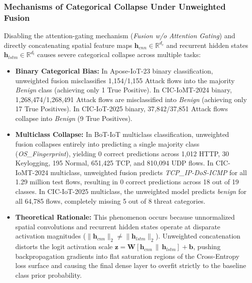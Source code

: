 \documentclass[a4paper,fleqn]{cas-sc}
\begin{document}
\subsubsection{Mechanisms of Categorical Collapse Under Unweighted Fusion}
Disabling the attention-gating mechanism (\textit{Fusion w/o Attention Gating}) and directly concatenating spatial feature maps $\mathbf{h}_{cnn} \in \mathbb{R}^{d_c}$ and recurrent hidden states $\mathbf{h}_{lstm} \in \mathbb{R}^{d_l}$ causes severe categorical collapse across multiple tasks:
\begin{itemize}
    \item \textbf{Binary Categorical Bias:} In Apose-IoT-23 binary classification, unweighted fusion misclassifies 1,154/1,155 Attack flows into the majority \textit{Benign} class (achieving only 1 True Positive). In CIC-IoMT-2024 binary, 1,268,474/1,268,491 Attack flows are misclassified into \textit{Benign} (achieving only 17 True Positives). In CIC-IoT-2025 binary, 37,842/37,851 Attack flows collapse into \textit{Benign} (9 True Positives).
    \item \textbf{Multiclass Collapse:} In BoT-IoT multiclass classification, unweighted fusion collapses entirely into predicting a single majority class (\textit{OS\_Fingerprint}), yielding 0 correct predictions across 1,012 HTTP, 30 Keylogging, 195 Normal, 651,425 TCP, and 810,094 UDP flows. In CIC-IoMT-2024 multiclass, unweighted fusion predicts \textit{TCP\_IP-DoS-ICMP} for all 1.29 million test flows, resulting in 0 correct predictions across 18 out of 19 classes. In CIC-IoT-2025 multiclass, the unweighted model predicts \textit{benign} for all 64,785 flows, completely missing 5 out of 8 threat categories.
    \item \textbf{Theoretical Rationale:} This phenomenon occurs because unnormalized spatial convolutions and recurrent hidden states operate at disparate activation magnitudes ($\|\mathbf{h}_{cnn}\|_2 \neq \|\mathbf{h}_{lstm}\|_2$). Unweighted concatenation distorts the logit activation scale $\mathbf{z} = \mathbf{W}[\mathbf{h}_{cnn} \,\|\, \mathbf{h}_{lstm}] + \mathbf{b}$, pushing backpropagation gradients into flat saturation regions of the Cross-Entropy loss surface and causing the final dense layer to overfit strictly to the baseline class prior probability.
\end{itemize}
\end{document}
